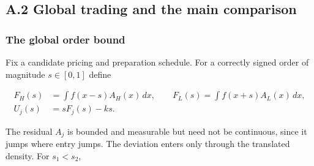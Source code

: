 
\subsection{A.2 Global trading and the main comparison}\label{pa-proofs}

\subsubsection{The global order bound}\label{the-global-order-bound}

Fix a candidate pricing and preparation schedule. For a correctly signed
order of magnitude \(s\in[0,1]\) define

\[
\begin{aligned}
F_H(s)&=\int f(x-s)A_H(x)\,dx,\qquad
F_L(s)=\int f(x+s)A_L(x)\,dx,\\
U_j(s)&=sF_j(s)-ks.
\end{aligned}
\tag{A.4}\label{eq:paper-a-4}
\]

The residual \(A_j\) is bounded and measurable but need not be
continuous, since it jumps where entry jumps. The deviation enters only
through the translated density. For \(s_1<s_2\),

